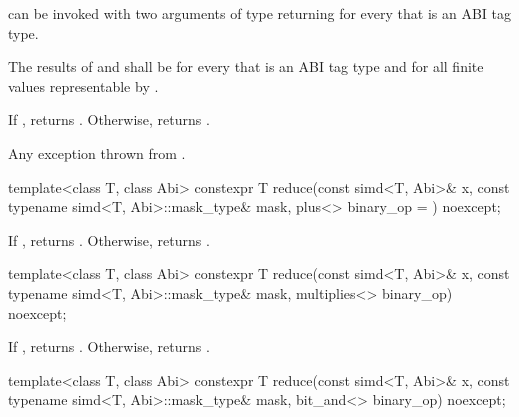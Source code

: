 \begin{itemdescr}
  \pnum\mandates
   can be invoked with two arguments of type  returning  for every  that is an ABI tag type.

  \pnum\expects
  The results of  and  shall be  for every  that is an ABI tag type and for all finite values  representable by .

  \pnum\returns
  If , returns .
  Otherwise, returns  \forallmaskedi.

  \pnum\throws
  Any exception thrown from .
\end{itemdescr}

\begin{itemdecl}
template<class T, class Abi>
  constexpr T reduce(const simd<T, Abi>& x, const typename simd<T, Abi>::mask_type& mask,
                     plus<> binary_op = {}) noexcept;
\end{itemdecl}

\begin{itemdescr}
  \pnum\returns
  If , returns . Otherwise, returns  \forallmaskedi.
\end{itemdescr}

\begin{itemdecl}
template<class T, class Abi>
  constexpr T reduce(const simd<T, Abi>& x, const typename simd<T, Abi>::mask_type& mask,
                     multiplies<> binary_op) noexcept;
\end{itemdecl}

\begin{itemdescr}
  \pnum\returns
  If , returns . Otherwise, returns  \forallmaskedi.
\end{itemdescr}

\begin{itemdecl}
template<class T, class Abi>
  constexpr T reduce(const simd<T, Abi>& x, const typename simd<T, Abi>::mask_type& mask,
                     bit_and<> binary_op) noexcept;
\end{itemdecl}

